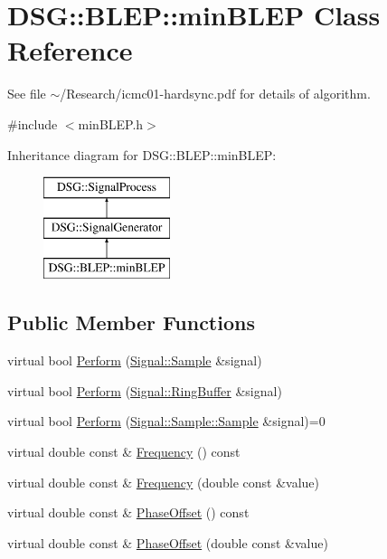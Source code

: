 \hypertarget{classDSG_1_1BLEP_1_1minBLEP}{\section{D\-S\-G\-:\-:B\-L\-E\-P\-:\-:min\-B\-L\-E\-P Class Reference}
\label{classDSG_1_1BLEP_1_1minBLEP}
}


See file $\sim$/\-Research/icmc01-\/hardsync.pdf for details of algorithm.  




{\ttfamily \#include $<$min\-B\-L\-E\-P.\-h$>$}

Inheritance diagram for D\-S\-G\-:\-:B\-L\-E\-P\-:\-:min\-B\-L\-E\-P\-:\begin{figure}[H]
\begin{center}
\leavevmode
\includegraphics[height=3.000000cm]{classDSG_1_1BLEP_1_1minBLEP}
\end{center}
\end{figure}
\subsection*{Public Member Functions}
\begin{DoxyCompactItemize}
\item 
virtual bool \hyperlink{classDSG_1_1SignalGenerator_a742c5dd499cb94bb27a73b7f76b1f535}{Perform} (\hyperlink{classDSG_1_1Signal_1_1Sample}{Signal\-::\-Sample} \&signal)
\item 
virtual bool \hyperlink{classDSG_1_1SignalGenerator_aabcdcbdf7a2dd73ec883a77f533b6355}{Perform} (\hyperlink{classDSG_1_1Signal_1_1RingBuffer}{Signal\-::\-Ring\-Buffer} \&signal)
\item 
virtual bool \hyperlink{classDSG_1_1SignalProcess_ae8a803d175eca1ec5f34a52035a082b4}{Perform} (\hyperlink{classDSG_1_1Signal_1_1Sample_a21db6fade3ee3554ed3887cb2b74daff}{Signal\-::\-Sample\-::\-Sample} \&signal)=0
\item 
virtual double const \& \hyperlink{classDSG_1_1SignalGenerator_aedac746c5a70818d120858542ecb7c45}{Frequency} () const 
\item 
virtual double const \& \hyperlink{classDSG_1_1SignalGenerator_ae3ce8d45bafabbd86a0f535b15c3cd46}{Frequency} (double const \&value)
\item 
virtual double const \& \hyperlink{classDSG_1_1SignalGenerator_a1ce521847edd0b837fd840998f906b4b}{Phase\-Offset} () const 
\item 
virtual double const \& \hyperlink{classDSG_1_1SignalGenerator_a08b71b1f30ba65e629642c570291dc0e}{Phase\-Offset} (double const \&value)
\end{DoxyCompactItemize}
